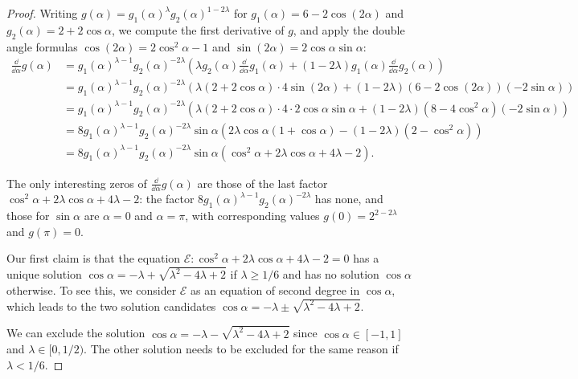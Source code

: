 \documentclass[11pt]{llncs}
\begin{document}
\begin{proof}
    Writing $g(\alpha)=g_1(\alpha)^{\lambda}g_2(\alpha)^{1-2\lambda}$ for $g_1(\alpha)=6-2\cos(2\alpha)$ and $g_2(\alpha)=2+2\cos\alpha$, we compute the first derivative of $g$, and apply the double angle formulas $\cos(2\alpha)=2\cos^2\alpha-1$ and $\sin(2\alpha)=2\cos\alpha\sin\alpha$:
    \begin{align*}
         \frac{\dd}{\dd\alpha}g(\alpha)&=g_1(\alpha)^{\lambda-1}g_2(\alpha)^{-2\lambda}\left(\lambda g_2(\alpha)\frac{\dd}{\dd\alpha}g_1(\alpha)+(1-2\lambda)g_1(\alpha)\frac{\dd}{\dd\alpha}g_2(\alpha)\right)\\
         &=g_1(\alpha)^{\lambda-1}g_2(\alpha)^{-2\lambda}\left(\lambda(2+2\cos\alpha)\cdot4\sin(2\alpha)+(1-2\lambda)(6-2\cos(2\alpha))(-2\sin\alpha)\right)\\
         &=g_1(\alpha)^{\lambda-1}g_2(\alpha)^{-2\lambda}\left(\lambda(2+2\cos\alpha)\cdot4\cdot2\cos\alpha\sin\alpha+(1-2\lambda)\left(8-4\cos^2\alpha\right)(-2\sin\alpha)\right)\\
         &=8g_1(\alpha)^{\lambda-1}g_2(\alpha)^{-2\lambda}\sin\alpha\left(2\lambda \cos\alpha(1+\cos\alpha)-(1-2\lambda)\left(2-\cos^2\alpha\right)\right)\\
         &=8g_1(\alpha)^{\lambda-1}g_2(\alpha)^{-2\lambda}\sin\alpha\left(\cos^2\alpha+2\lambda\cos\alpha+4\lambda-2\right).
    \end{align*}
    
    The only interesting zeros of $\frac{\dd}{\dd\alpha}g(\alpha)$ are those of the last factor 
    $\cos^2\alpha+2\lambda\cos\alpha+4\lambda-2$: the factor $8g_1(\alpha)^{\lambda-1}g_2(\alpha)^{-2\lambda}$ has none, and those for $\sin\alpha$ are $\alpha=0$ and $\alpha=\pi$, with corresponding values $g(0)=2^{2-2\lambda}$ and $g(\pi)=0$.
    
    Our first claim is that the equation $\mathcal E:\cos^2\alpha+2\lambda\cos\alpha+4\lambda-2=0$ has a unique solution $\cos\alpha=-\lambda+\sqrt{\lambda^2-4\lambda+2}$ if $\lambda\geq 1/6$ and has no solution $\cos\alpha$ otherwise. To see this, we consider $\mathcal E$ as an equation of second degree in $\cos\alpha$, which leads to the two solution candidates $\cos\alpha=-\lambda\pm\sqrt{\lambda^2-4\lambda+2}$.
     
    We can exclude the solution $\cos\alpha=-\lambda-\sqrt{\lambda^2-4\lambda+2}$ since $\cos\alpha\in[-1,1]$ and $\lambda\in [0,1/2)$. 
    The other solution needs to be excluded for the same reason if $\lambda<1/6$.


\end{proof}
\end{document}
